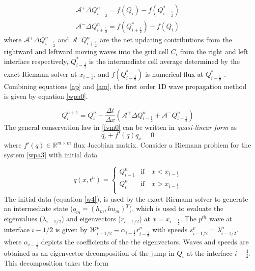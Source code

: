 \documentclass[12pt,a4paper]{article}
\begin{document}
	\begin{eqnarray}
		\mathcal{A^{+}}\Delta Q_{i-\frac{1}{2}}^{n} = f(Q_{i}) - f(Q_{i-\frac{1}{2}}^{*})
		\label{ap}\\
		\mathcal{A^{-}}\Delta Q_{i+\frac{1}{2}}^{n} = f(Q_{i+\frac{1}{2}}^{*}) - f(Q_{i}) 
		\label{am}
	\end{eqnarray}	
	where  $\mathcal{A^{+}}\Delta 	Q_{i-\frac{1}{2}}^{n}$ and  $\mathcal{A^{-}}Q_{i+\frac{1}{2}}^{n}$ are the net updating contributions from the rightward and leftward moving waves into the grid cell $C_{i}$  from the right and left interface respectively,  $Q_{i-\frac{1}{2}}^{*}$ is the intermediate cell average determined by the exact Riemann solver at $x_{i-\frac{1}{2}}$, and $ f(Q_{i-\frac{1}{2}}^{*})$ is numerical flux at $Q_{i-\frac{1}{2}}^{*}$ \cite{ge:2008}. Combining equations \eqref{ap} and \eqref{am}, the  first order 1D  wave propagation method is given by equation \eqref{wpa0}.
	
	\begin{equation}
		Q_{i}^{n+1} =  Q_{i}^{n} - \frac{\Delta t}{\Delta x}(\mathcal{A^{+}}\Delta 	Q_{i-\frac{1}{2}}^{n} + \mathcal{A^{-}}Q_{i+\frac{1}{2}}^{n})
		\label{wpa0}
	\end{equation}
	\label{section:my}
	The general conservation law in \eqref{fvm0} can be written in {\em quasi-linear form}
	as
	\begin{equation}
		q_{t} + f'(q)q_{x} = 0
		\label{wpa3}
	\end{equation}
	where  $f'(q) \in \mathbb{R}^{m\times m}$  flux Jacobian matrix.  Consider a Riemann problem for the system  \eqref{wpa3} with initial data 
	
	\begin{equation}
		q(x,t^n)  = \begin{cases}
			Q_{i-1}^{n}  & \text{if} \quad  x < x_{i-\frac{1}{2}}\\
			Q_{i}^{n} & \text{if} \quad x > x_{i-\frac{1}{2}}\\
		\end{cases}    
		\label{w4}   
	\end{equation}
	The initial data (equation \eqref{w4}), is used by the exact Riemann solver to generate an intermediate state ($q_m = (h_m, hu_m)^T$), which is used to evaluate the eigenvalues ($\lambda_{i-1/2}$) and eigenvectors ($r_{i-1/2}$) at $x = x_{i-\frac{1}{2}}$. The $p^{th}$ wave at interface $i-1/2$ is given by $\mathcal W^p_{i-1/2} \equiv \alpha_{i-\frac{1}{2}} r^p_{i-\frac{1}{2}}$ with speeds $s^p_{i-1/2} = \lambda^p_{i-1/2}$\cite{leveque2002finite}. where $ \alpha_{i-\frac{1}{2}}$ depicts the coefficients of the the eigenvectors.  Waves and speeds are obtained as an eigenvector decomposition of the jump in $Q_i$ at the interface $i-\frac{1}{2}$.  This decomposition takes the form
	
\end{document}
